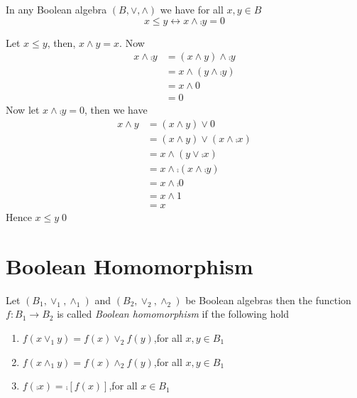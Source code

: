 \begin{theo}
\label{thm_2.8}
    In any Boolean algebra \((B,\vee,\wedge)\) we have for all \(x,y\in B\)
    \[
    x\leq y \longleftrightarrow x\wedge\comp{y}=0
    \]
\end{theo}

\begin{myproof}
    Let \(x\leq y\), then, \(x\wedge y=x\). Now
    \begin{align*}
        x\wedge\comp{y}&=(x\wedge y)\wedge\comp{y}\\
        &=x\wedge(y\wedge\comp{y})\\
        &=x\wedge0\\
        &=0
    \end{align*}
    Now let \(x\wedge\comp{y}=0\), then we have
    \begin{align*}
        x\wedge y&=(x\wedge y)\vee0\\
        &=(x\wedge y)\vee(x\wedge\comp{x})\\
        &=x\wedge(y\vee\comp{x})\\
        &=x\wedge\comp{(x\wedge\comp{y})}\\
        &=x\wedge\comp{0}\\
        &=x\wedge1\\
        &=x
    \end{align*}
    Hence \(x\leq y\)\qed
\end{myproof}

\section{Boolean Homomorphism}

\begin{mydef}
    Let \((B_1,\vee_1,\wedge_1)\) and \((B_2,\vee_2,\wedge_2)\) be Boolean algebras then the function \(f:B_1\longrightarrow B_2\) is called \textit{Boolean homomorphism} if the following hold
    \begin{enumerate}
        \item \(f(x\vee_1 y)=f(x)\vee_2 f(y)\),\quad for all \(x,y\in B_1\)

        \item \(f(x\wedge_1 y)=f(x)\wedge_2 f(y)\),\quad for all \(x,y\in B_1\)

        \item \(f(\comp{x})=\comp{[f(x)]}\),\quad for all \(x\in B_1\)
    \end{enumerate}
\end{mydef}

